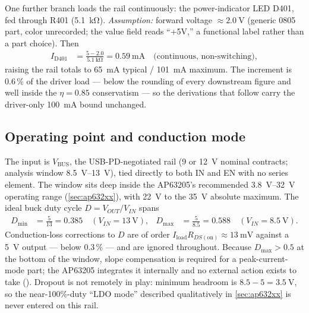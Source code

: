 One further branch loads the rail continuously: the power-indicator LED D401, fed
through R401 (\SI{5.1}{\kilo\ohm}). \emph{Assumption:} forward voltage
$\approx\SI{2.0}{\volt}$ (generic 0805 part, color unrecorded; the value field reads
``+5V,'' a functional label rather than a part choice). Then
\begin{align*}
  I_{\mathrm{D401}} &= \frac{5-2.0}{\SI{5.1}{\kilo\ohm}} = \SI{0.59}{\milli\ampere}
    \quad\text{(continuous, non-switching)},
\end{align*}
raising the rail totals to \SI{65}{\milli\ampere} typical / \SI{101}{\milli\ampere}
maximum. The increment is 0.6\,\% of the driver load --- below the rounding of every
downstream figure and well inside the $\eta=0.85$ conservatism --- so the derivations
that follow carry the driver-only \SI{100}{\milli\ampere} bound unchanged.

\subsection{Operating point and conduction mode}\label{sec:5v-op}

The input is $V_{\mathrm{BUS}}$, the USB-PD-negotiated rail (9 or \SI{12}{\volt} nominal
contracts; analysis window \SIrange{8.5}{13}{\volt}), tied directly to both IN and EN with
no series element. The window sits deep inside the AP63205's recommended
\SIrange{3.8}{32}{\volt} operating range (\cref{sec:ap632xx}), with \SI{22}{\volt} to the
\SI{35}{\volt} absolute maximum. The ideal buck duty cycle $D = V_{OUT}/V_{IN}$ spans
\begin{align*}
  D_{\min} &= \frac{5}{13} = 0.385 \quad (V_{IN}=\SI{13}{\volt}), &
  D_{\max} &= \frac{5}{8.5} = 0.588 \quad (V_{IN}=\SI{8.5}{\volt}).
\end{align*}
Conduction-loss corrections to $D$ are of order $I_{\mathrm{load}} R_{DS(\mathrm{on})}
\approx \SI{13}{\milli\volt}$ against a 5~V output --- below 0.3\,\% --- and are ignored
throughout. Because $D_{\max} > 0.5$ at the bottom of the window, slope compensation is
required for a peak-current-mode part; the AP63205 integrates it internally and no
external action exists to take (). Dropout is not remotely in play:
minimum headroom is $8.5 - 5 = \SI{3.5}{\volt}$, so the near-100\%-duty ``LDO mode''
described qualitatively in \cref{sec:ap632xx} is never entered on this rail.

